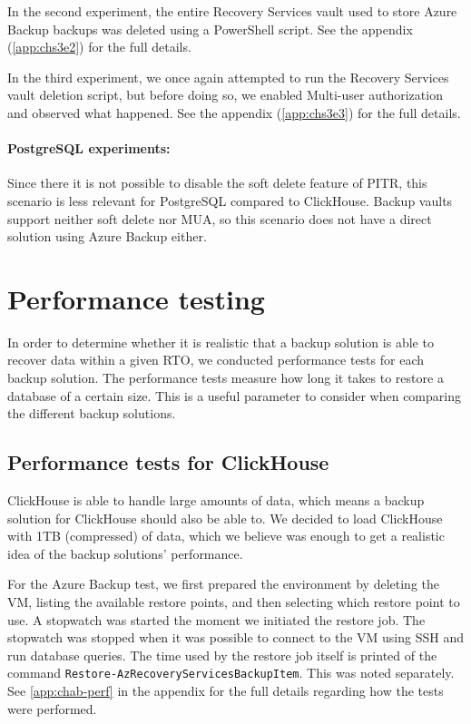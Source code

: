 In the second experiment, the entire Recovery Services vault used to store Azure Backup backups
was deleted using a PowerShell script.
See the appendix (\ref{app:chs3e2}) for the full details.

In the third experiment, we once again attempted to run the Recovery Services vault deletion script,
but before doing so, we enabled Multi-user authorization and observed what happened.
See the appendix (\ref{app:chs3e3}) for the full details.

\paragraph{PostgreSQL experiments:} \label{pg_sc3}
Since there it is not possible to disable the soft delete feature of PITR, this scenario is less relevant for PostgreSQL compared to ClickHouse. Backup vaults support neither soft delete nor MUA, so this scenario does not have a direct solution using Azure Backup either.  

\section{Performance testing} \label{Perftest}

In order to determine whether it is realistic that a backup solution 
is able to recover data within a given RTO,
we conducted performance tests for each backup solution.
The performance tests measure how long it takes to restore a database of a certain size.
This is a useful parameter to consider when comparing the different backup solutions.  

\subsection{Performance tests for ClickHouse}
ClickHouse is able to handle large amounts of data,
which means a backup solution for ClickHouse should also be able to.
We decided to load ClickHouse with 1TB (compressed) of data,
which we believe was enough to get a realistic idea of
the backup solutions' performance.

For the Azure Backup test, we first prepared the environment by deleting the VM, listing the available restore points, and then selecting which restore point to use. A stopwatch was started the moment we initiated the restore job. The stopwatch was stopped when it was possible to connect to the VM using SSH and run database queries. The time used by the restore job itself is printed of the command 
\noindent \texttt{Restore-AzRecoveryServicesBackupItem}.
This was noted separately.
See \ref{app:chab-perf} in the appendix for the full details regarding how the tests were performed.

